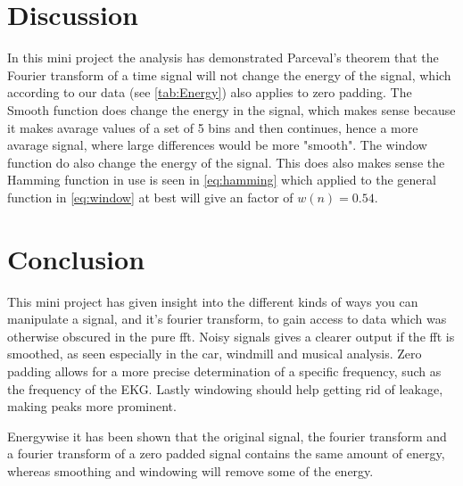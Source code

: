 \section{Discussion}

In this mini project the analysis has demonstrated Parceval's theorem that the Fourier transform of a time signal will not change the energy of the signal, which according to our data (see \cref{tab:Energy}) also applies to zero padding. The Smooth function does change the energy in the signal, which makes sense because it makes avarage values of a set of 5 bins and then continues, hence a more avarage signal, where large differences would be more "smooth". The window function do also change the energy of the signal. This does also makes sense the Hamming function in use is seen in \cref{eq:hamming} which applied to the general function in \cref{eq:window} at best will give an factor of $w(n)=0.54$.

\newpage
\section{Conclusion}

This mini project has given insight into the different kinds of ways you can manipulate a signal, and it's fourier transform, to gain access to data which was otherwise obscured in the pure fft. Noisy signals gives a clearer output if the fft is smoothed, as seen especially in the car, windmill and musical analysis. Zero padding allows for a more precise determination of a specific frequency, such as the frequency of the EKG. Lastly windowing should help getting rid of leakage, making peaks more prominent.

Energywise it has been shown that the original signal, the fourier transform and a fourier transform of a zero padded signal contains the same amount of energy, whereas smoothing and windowing will remove some of the energy.